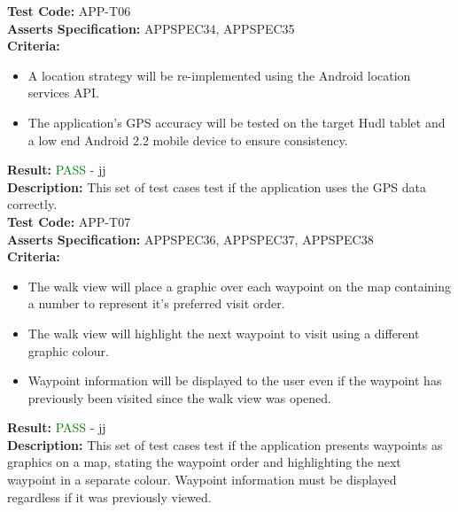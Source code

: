 \documentclass[11pt,a4paper]{report}
\begin{document}
\label{test:APP-T06}
\noindent\textbf{Test Code:} APP-T06\\
\textbf{Asserts Specification:} APPSPEC34, APPSPEC35\\ 
\textbf{Criteria:} \begin{itemize}
                     \item A location strategy will be re-implemented using the Android location services API.
                     \item The application's GPS accuracy will be tested on the target Hudl tablet and a low end Android 2.2 mobile device to ensure consistency. 
                     \end{itemize}
                   
\textbf{Result:} \textcolor{green}{PASS} - jj\\
\textbf{Description:} This set of test cases test if the application uses the GPS data correctly.\\

\label{test:APP-T07}
\noindent\textbf{Test Code:} APP-T07\\
\textbf{Asserts Specification:} APPSPEC36, APPSPEC37, APPSPEC38\\ 
\textbf{Criteria:} \begin{itemize}
                     \item  The walk view will place a graphic over each waypoint on the map containing a number to represent it's preferred visit order.
                     \item The walk view will highlight the next waypoint to visit using a different graphic colour.
                     \item Waypoint information will be displayed to the user even if the waypoint has previously been visited since the walk view was opened. 
                   \end{itemize}
\textbf{Result:} \textcolor{green}{PASS} - jj\\
\textbf{Description:} This set of test cases test if the application presents waypoints as graphics on a map, stating the waypoint order and highlighting the next waypoint in a separate colour. Waypoint information must be displayed regardless if it was previously viewed.\\
\end{document}
